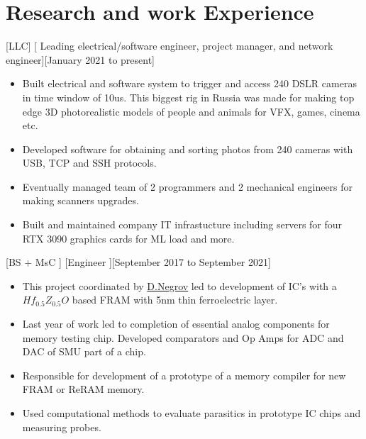 \documentclass{article}
\begin{document}
\section{Research and work Experience}
 

 


[LLC]
[ Leading electrical/software engineer, project manager, and network engineer][January 2021 to present]
 
\begin{itemize}
   \item Built electrical and software system to trigger and access 240 DSLR cameras in time window of 10us. This biggest rig in Russia was made for making top edge 3D photorealistic models of people and animals for VFX, games, cinema etc.
   \item Developed software for obtaining and sorting photos from 240 cameras with USB, TCP and SSH protocols.
   \item Eventually managed team of 2 programmers and 2 mechanical engineers for making scanners upgrades.
   \item Built and maintained company IT infrastucture including servers for four RTX 3090 graphics cards for ML load and more.
   \end{itemize}

[BS + MsC ]
[Engineer ][September 2017 to September 2021]

\begin{itemize}
\item This project coordinated by  \href{https://www.scopus.com/authid/detail.uri?authorId=56272708000}{D.Negrov}   led to development of IC's with a $Hf_{0.5} Z_{0.5} O $ based  FRAM with 5nm thin ferroelectric layer.
\item Last year of work led to completion of essential analog components for memory testing chip. Developed comparators and Op Amps for ADC and DAC of SMU part of a chip.
\item Responsible for development of a prototype of a memory  compiler for new FRAM or ReRAM memory.
\item Used computational methods to evaluate parasitics in prototype IC chips and measuring probes.

\end{itemize}
 
\end{document}
